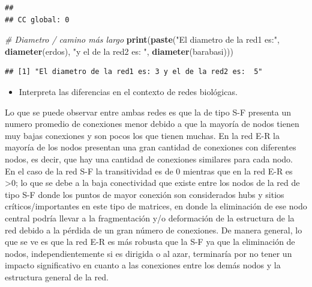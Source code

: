\documentclass[
]{article}
\newenvironment{Shaded}{\begin{snugshade}}{\end{snugshade}}
\newcommand{\CommentTok}[1]{\textcolor[rgb]{0.56,0.35,0.01}{\textit{#1}}}
\newcommand{\FunctionTok}[1]{\textcolor[rgb]{0.13,0.29,0.53}{\textbf{#1}}}
\newcommand{\NormalTok}[1]{#1}
\newcommand{\StringTok}[1]{\textcolor[rgb]{0.31,0.60,0.02}{#1}}
\providecommand{\tightlist}{%
  \setlength{\itemsep}{0pt}\setlength{\parskip}{0pt}}
\begin{document}
\begin{verbatim}
## 
## CC global: 0
\end{verbatim}

\begin{Shaded}
\begin{Highlighting}[]
\CommentTok{\# Diametro / camino más largo}
\FunctionTok{print}\NormalTok{(}\FunctionTok{paste}\NormalTok{(}\StringTok{"El diametro de la red1 es:"}\NormalTok{, }\FunctionTok{diameter}\NormalTok{(erdos), }\StringTok{"y el de la red2 es: "}\NormalTok{, }\FunctionTok{diameter}\NormalTok{(barabasi)))}
\end{Highlighting}
\end{Shaded}

\begin{verbatim}
## [1] "El diametro de la red1 es: 3 y el de la red2 es:  5"
\end{verbatim}

\begin{itemize}
\tightlist
\item
  Interpreta las diferencias en el contexto de redes biológicas.
\end{itemize}

Lo que se puede observar entre ambas redes es que la de tipo S-F
presenta un numero promedio de conexiones menor debido a que la mayoría
de nodos tienen muy bajas conexiones y son pocos los que tienen muchas.
En la red E-R la mayoría de los nodos presentan una gran cantidad de
conexiones con diferentes nodos, es decir, que hay una cantidad de
conexiones similares para cada nodo.\\
En el caso de la red S-F la transitividad es de 0 mientras que en la red
E-R es \textgreater0; lo que se debe a la baja conectividad que existe
entre los nodos de la red de tipo S-F donde los puntos de mayor conexión
son considerados hubs y sitios críticos/importantes en este tipo de
matrices, en donde la eliminación de ese nodo central podría llevar a la
fragmentación y/o deformación de la estructura de la red debido a la
pérdida de un gran número de conexiones. De manera general, lo que se ve
es que la red E-R es más robusta que la S-F ya que la eliminación de
nodos, independientemente si es dirigida o al azar, terminaría por no
tener un impacto significativo en cuanto a las conexiones entre los
demás nodos y la estructura general de la red.
\end{document}
